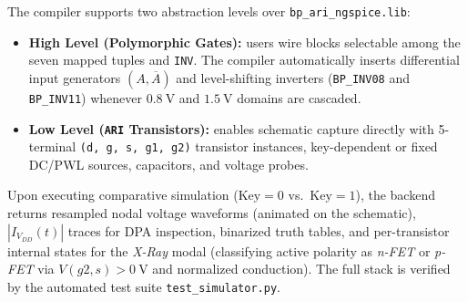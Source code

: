 The compiler supports two abstraction levels over \texttt{bp\_ari\_ngspice.lib}:
\begin{itemize}
    \item \textbf{High Level (Polymorphic Gates):} users wire blocks selectable among the seven mapped tuples and \texttt{INV}. The compiler automatically inserts differential input generators $(A, \overline{A})$ and level-shifting inverters (\texttt{BP\_INV08} and \texttt{BP\_INV11}) whenever $0.8\ \text{V}$ and $1.5\ \text{V}$ domains are cascaded.
    \item \textbf{Low Level (\texttt{ARI} Transistors):} enables schematic capture directly with 5-terminal \texttt{(d, g, s, g1, g2)} transistor instances, key-dependent or fixed DC/PWL sources, capacitors, and voltage probes.
\end{itemize}
Upon executing comparative simulation ($\text{Key}=0$ vs.\ $\text{Key}=1$), the backend returns resampled nodal voltage waveforms (animated on the schematic), $|I_{V_{DD}}(t)|$ traces for DPA inspection, binarized truth tables, and per-transistor internal states for the \textit{X-Ray} modal (classifying active polarity as \textit{n-FET} or \textit{p-FET} via $V(g2,s) > 0\ \text{V}$ and normalized conduction). The full stack is verified by the automated test suite \texttt{test\_simulator.py}.
